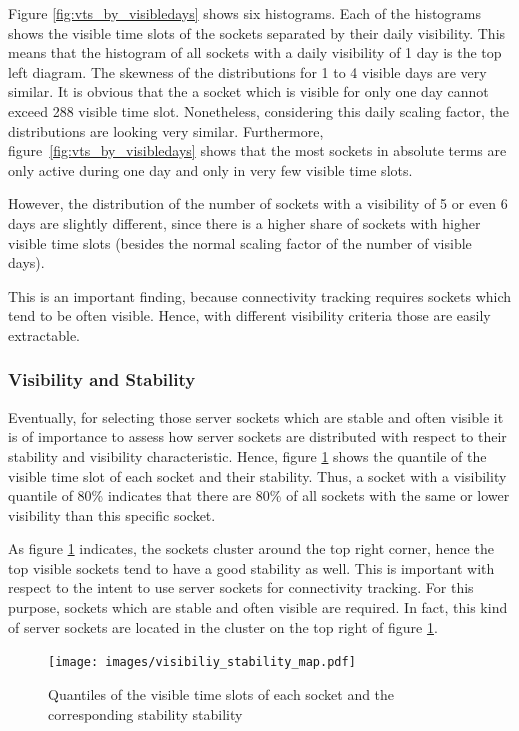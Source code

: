 Figure \ref{fig:vts_by_visibledays} shows six histograms. Each of the histograms shows the visible time slots of the sockets separated by their daily visibility. This means that the histogram of all sockets with a daily visibility of 1 day is the top left diagram. The skewness of the distributions for 1 to 4 visible days are very similar. 
It is obvious that the a socket which is visible for only one day cannot exceed 288 visible time slot. 
Nonetheless, considering this daily scaling factor, the distributions are looking very similar. 
Furthermore, figure \ref{fig:vts_by_visibledays} shows that the most sockets in absolute terms are only active during one day and only in very few visible time slots.

However, the distribution of the number of sockets with a visibility of 5 or even 6 days are slightly different, since there is a higher share of sockets with higher visible time slots (besides the normal scaling factor of the number of visible days).

This is an important finding, because connectivity tracking requires sockets which tend to be often visible. Hence, with different visibility criteria those are easily extractable. 

\subsubsection{Visibility and Stability} Eventually, for selecting those \glspl{server socket} which are stable and often visible it is of importance to assess how \glspl{server socket} are distributed with respect to their stability and visibility characteristic. 
Hence, figure \ref{fig:rankedVisibility} shows the quantile of the visible time slot of each socket and their stability. 
Thus, a socket with a visibility quantile of 80\% indicates that there are 80\% of all sockets with the same or lower visibility than this specific socket.

As figure \ref{fig:rankedVisibility} indicates, the sockets cluster around the top right corner, hence the top visible sockets tend to have a good stability as well. This is important with respect to the intent to use server sockets for connectivity tracking. For this purpose, sockets which are stable and often visible are required. In fact, this kind of server sockets are located in the cluster on the top right of figure \ref{fig:rankedVisibility}.
 
\begin{figure}[ht] \centering 
	\texttt{[image: images/visibiliy\_stability\_map.pdf]} \caption{Quantiles of the visible time slots of each socket and the corresponding stability stability} 
	\label{fig:rankedVisibility} 
\end{figure}

